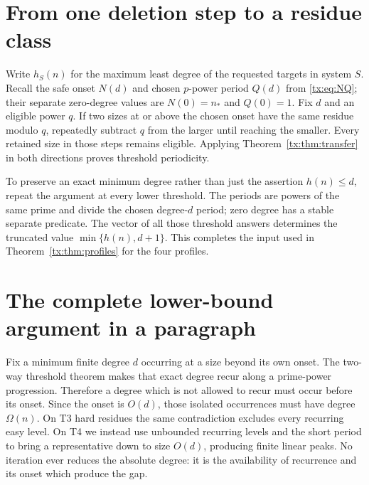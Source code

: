 \section{From one deletion step to a residue class}
Write $h_S(n)$ for the maximum least degree of the requested targets
in system $S$. Recall the safe onset $N(d)$ and chosen $p$-power period
$Q(d)$ from \eqref{tx:eq:NQ}; their separate zero-degree values are
$N(0)=n_*$ and $Q(0)=1$.
Fix $d$ and an eligible power $q$. If two sizes at or above the chosen
onset have the same residue modulo $q$, repeatedly subtract $q$ from
the larger until reaching the smaller. Every retained size in those
steps remains eligible. Applying Theorem~\ref{tx:thm:transfer} in both
directions proves threshold periodicity.

To preserve an exact minimum degree rather than just the assertion
$h(n)\le d$, repeat the argument at every lower threshold. The periods
are powers of the same prime and divide the chosen degree-$d$ period;
zero degree has a stable separate predicate. The vector of all those
threshold answers determines the truncated value
$\min\{h(n),d+1\}$. This completes the input used in
Theorem~\ref{tx:thm:profiles} for the four profiles.

\section{The complete lower-bound argument in a paragraph}
Fix a minimum finite degree $d$ occurring at a size beyond its own onset.
The two-way threshold theorem makes that exact degree recur along a
prime-power progression. Therefore a degree which is not allowed to recur
must occur before its onset. Since the onset is $O(d)$, those isolated
occurrences must have degree $\Omega(n)$. On T3 hard residues the same
contradiction excludes every recurring easy level. On T4 we instead use
unbounded recurring levels and the short period to bring a representative
down to size $O(d)$, producing finite linear peaks. No iteration ever
reduces the absolute degree: it is the availability of recurrence and
its onset which produce the gap.
